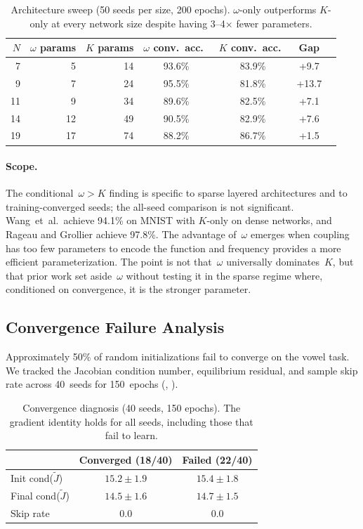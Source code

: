\documentclass[11pt,a4paper]{article}
\begin{document}
\begin{table}[t]
  \centering
  \caption{%
    Architecture sweep (50 seeds per size, 200 epochs). $\omega$-only
    outperforms $K$-only at every network size despite having
    3--4$\times$ fewer parameters.
  }
  \label{tab:sweep}
  \begin{tabular}{@{}rrrcccc@{}}
    \toprule
    $N$ & $\omega$ params & $K$ params & $\omega$ conv.\ acc.\ & $K$ conv.\ acc.\ & Gap \\
    \midrule
    7  & 5  & 14 & 93.6\% & 83.9\% & +9.7 \\
    9  & 7  & 24 & 95.5\% & 81.8\% & +13.7 \\
    11 & 9  & 34 & 89.6\% & 82.5\% & +7.1 \\
    14 & 12 & 49 & 90.5\% & 82.9\% & +7.6 \\
    19 & 17 & 74 & 88.2\% & 86.7\% & +1.5 \\
    \bottomrule
  \end{tabular}
\end{table}

\paragraph{Scope.} The conditional~$\omega > K$ finding is specific to
sparse layered architectures and to training-converged seeds; the all-seed
comparison is not significant. Wang~et~al.\ achieve 94.1\% on MNIST with
$K$-only on dense networks, and Rageau and Grollier achieve 97.8\%.
The advantage of~$\omega$ emerges when coupling has too few parameters to
encode the function and frequency provides a more efficient
parameterization. The point is not that~$\omega$ universally dominates~$K$,
but that prior work set aside~$\omega$ without testing it in the sparse
regime where, conditioned on convergence, it is the stronger parameter.

\subsection{Convergence Failure Analysis}
\label{sec:convergence}

Approximately 50\% of random initializations fail to converge on the vowel
task. We tracked the Jacobian condition number, equilibrium residual, and
sample skip rate across 40~seeds for 150~epochs (,
).

\begin{table}[t]
  \centering
  \caption{%
    Convergence diagnosis (40 seeds, 150 epochs). The gradient identity
    holds for all seeds, including those that fail to learn.
  }
  \label{tab:convergence}
  \begin{tabular}{@{}lcc@{}}
    \toprule
    & Converged (18/40) & Failed (22/40) \\
    \midrule
    Init cond($\tilde{J}$) & $15.2 \pm 1.9$ & $15.4 \pm 1.8$ \\
    Final cond($\tilde{J}$) & $14.5 \pm 1.6$ & $14.7 \pm 1.5$ \\
    Skip rate & 0.0 & 0.0 \\
    \bottomrule
  \end{tabular}
\end{table}
\end{document}
